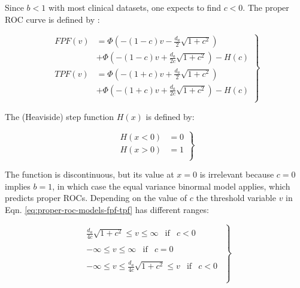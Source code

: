 \documentclass[
]{book}
\begin{document}
Since \(b < 1\) with most clinical datasets, one expects to find \(c < 0\). The proper ROC curve is defined by \citep{metz1999proper}:

\begin{equation} 
\left.\begin{aligned}
FPF\left( v \right) &= \Phi\left( -\left( 1-c \right)v -\frac{d_a}{2}\sqrt{1+c^2}  \right) \\ 
&+\Phi\left( -\left( 1-c \right)v +\frac{d_a}{2c}\sqrt{1+c^2} \right)  -H(c) \\
TPF\left( v \right) &= \Phi\left( -\left( 1+c \right)v +\frac{d_a}{2}\sqrt{1+c^2}  \right)  \\ &+\Phi\left( -\left( 1+c \right)v +\frac{d_a}{2c}\sqrt{1+c^2} \right)  -H(c) \\
\end{aligned}\right\}
\label{eq:proper-roc-models-fpf-tpf}
\end{equation}

The (Heaviside) step function \(H(x)\) is defined by:

\begin{equation} 
\left.\begin{aligned}
H\left( x < 0 \right) &= 0 \\
H\left( x > 0 \right) &= 1 \\
\end{aligned}\right\}
\label{eq:proper-roc-models-heaviside}
\end{equation}

The function is discontinuous, but its value at \(x = 0\) is irrelevant because \(c = 0\) implies \(b = 1\), in which case the equal variance binormal model applies, which predicts proper ROCs. Depending on the value of \(c\) the threshold variable \(v\) in Eqn. \eqref{eq:proper-roc-models-fpf-tpf} has different ranges:

\begin{equation} 
\left.\begin{aligned}
\begin{matrix}
\frac{d_a}{4c}\sqrt{1+c^2} \le v \le \infty & \text{if} & c<0 
\end{matrix}\\
\begin{matrix}
-\infty \le v \le \infty & \text{if} & c=0 
\end{matrix}\\
\begin{matrix}
-\infty \le v \le\frac{d_a}{4c}\sqrt{1+c^2} \le v & \text{if} & c<0 
\end{matrix}\\
\\
\end{aligned}\right\}
\label{eq:proper-roc-models-limits-v}
\end{equation}
\end{document}
